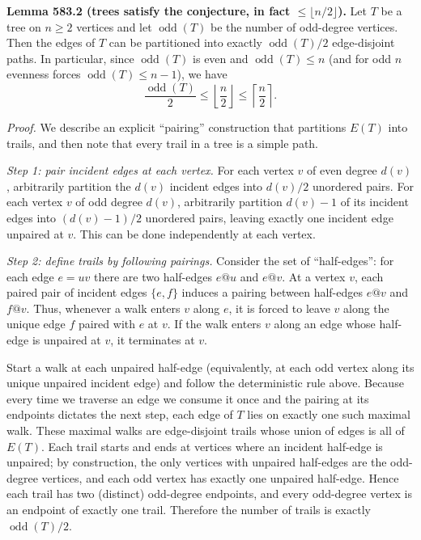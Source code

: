 \bigskip
\noindent\textbf{Lemma 583.2 (trees satisfy the conjecture, in fact $\le \lfloor n/2\rfloor$).}
Let $T$ be a tree on $n\ge 2$ vertices and let $\operatorname{odd}(T)$ be the number of odd-degree vertices.
Then the edges of $T$ can be partitioned into exactly $\operatorname{odd}(T)/2$ edge-disjoint paths.
In particular, since $\operatorname{odd}(T)$ is even and $\operatorname{odd}(T)\le n$ (and for odd $n$ evenness forces $\operatorname{odd}(T)\le n-1$), we have
\[
\frac{\operatorname{odd}(T)}2\le \left\lfloor \frac n2\right\rfloor\le \left\lceil \frac n2\right\rceil.
\]

\noindent\emph{Proof.}
We describe an explicit ``pairing'' construction that partitions $E(T)$ into trails, and then note that every trail in a tree is a simple path.

\emph{Step 1: pair incident edges at each vertex.}
For each vertex $v$ of even degree $d(v)$, arbitrarily partition the $d(v)$ incident edges into $d(v)/2$ unordered pairs.
For each vertex $v$ of odd degree $d(v)$, arbitrarily partition $d(v)-1$ of its incident edges into $(d(v)-1)/2$ unordered pairs, leaving exactly one incident edge unpaired at $v$.
This can be done independently at each vertex.

\emph{Step 2: define trails by following pairings.}
Consider the set of ``half-edges'': for each edge $e=uv$ there are two half-edges $e@u$ and $e@v$.
At a vertex $v$, each paired pair of incident edges $\{e,f\}$ induces a pairing between half-edges $e@v$ and $f@v$.
Thus, whenever a walk enters $v$ along $e$, it is forced to leave $v$ along the unique edge $f$ paired with $e$ at $v$.
If the walk enters $v$ along an edge whose half-edge is unpaired at $v$, it terminates at $v$.

Start a walk at each unpaired half-edge (equivalently, at each odd vertex along its unique unpaired incident edge) and follow the deterministic rule above.
Because every time we traverse an edge we consume it once and the pairing at its endpoints dictates the next step, each edge of $T$ lies on exactly one such maximal walk.
These maximal walks are edge-disjoint trails whose union of edges is all of $E(T)$.
Each trail starts and ends at vertices where an incident half-edge is unpaired; by construction, the only vertices with unpaired half-edges are the odd-degree vertices, and each odd vertex has exactly one unpaired half-edge.
Hence each trail has two (distinct) odd-degree endpoints, and every odd-degree vertex is an endpoint of exactly one trail.
Therefore the number of trails is exactly $\operatorname{odd}(T)/2$.


